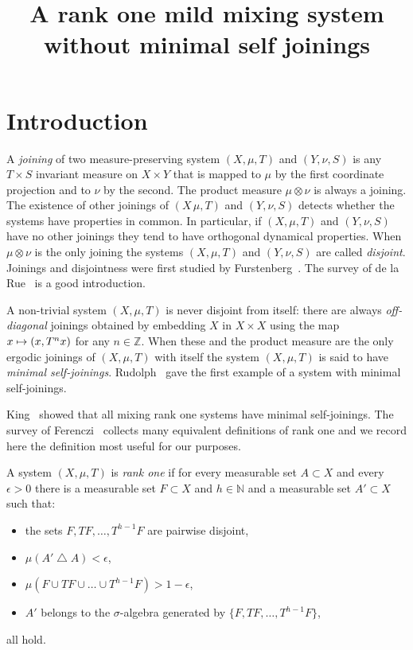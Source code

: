 \documentclass[AHL,Unicode,longabstracts,published]{cedram}
\title{A rank one mild mixing system without minimal self joinings}
\author[\initial{J.} \lastname{Chaika}]{\firstname{Jon} \lastname{Chaika}}
\author[\initial{D.} \lastname{Robertson}]{\firstname{Donald} \lastname{Robertson}}
\DeclareMathOperator{\symdiff}{\triangle}
\newcommand{\N}{\mathbb{N}}
\newcommand{\Z}{\mathbb{Z}}
\let\oldmapsto\mapsto
\renewcommand*{\mapsto}{\mathchoice{\longmapsto}{\oldmapsto}{\oldmapsto}{\oldmapsto}}
\begin{document}
\maketitle



\section{Introduction}

A \emph{joining} of two measure-preserving system $(X,\mu,T)$ and $(Y, \nu,S)$ is any $T \times S$ invariant measure on $X \times Y$ that is mapped to $\mu$ by the first coordinate projection and to $\nu$ by the second. The product measure $\mu \otimes \nu$ is always a joining. The existence of other joinings of $(X\,\mu,T)$ and $(Y,\nu,S)$ detects whether the systems have properties in common. In particular, if $(X,\mu,T)$ and $(Y,\nu,S)$ have no other joinings they tend to have orthogonal dynamical properties. When $\mu \otimes \nu$ is the only joining the systems $(X,\mu,T)$ and $(Y,\nu,S)$ are called
\emph{disjoint}. Joinings and disjointness were first studied by Furstenberg~\cite{MR0213508}. The survey of de la Rue~\cite{MR4647076} is a good introduction.

A non-trivial system $(X,\mu,T)$ is never disjoint from itself: there are always
\emph{off-diagonal} joinings obtained by embedding $X$ in $X \times X$ using the map $x \mapsto (x,T^n x)$ for any $n \in \Z$. When these and the product measure are the only ergodic joinings of $(X,\mu,T)$ with itself the system $(X,\mu,T)$ is said to have
\emph{minimal self-joinings}. Rudolph~\cite{MR0555301} gave the first example of a system with minimal self-joinings.

King~\cite{MR0963154} showed that all mixing rank one systems have minimal self-joinings. The survey of Ferenczi~\cite{MR1436950} collects many equivalent definitions of rank one and we record here the definition most useful for our purposes.

\begin{defi}[{\cite[Definition~6]{MR1436950}}]
A system $(X,\mu,T)$ is
\emph{rank one} if for every measurable set $A \subset X$ and every $\epsilon > 0$ there is a measurable set $F \subset X$ and $h \in \N$ and a measurable set $A' \subset X$ such that:
\begin{itemize}
\item the sets $F, TF,\dots,T^{h-1} F$ are pairwise disjoint,
\item $\mu(A' \symdiff A) < \epsilon$,
\item $\mu(F \cup TF \cup \dots \cup T^{h-1} F) > 1 - \epsilon$,
\item $A'$ belongs to the $\sigma$-algebra generated by $\{ F, TF,\dots, T^{h-1} F\}$,
\end{itemize}
all hold.
\end{defi}
\end{document}
